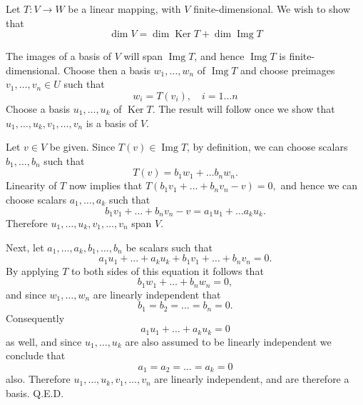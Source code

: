 \documentclass[12pt]{article}
\newcommand{\Ker}{\mathop{\mathrm{Ker}}}
\newcommand{\Img}{\mathop{\mathrm{Img}}}
\begin{document}
Let $T:V\rightarrow W$ be a linear mapping, with $V$
finite-dimensional.  We wish to show that
$$\dim V = \dim \Ker T + \dim\Img T$$

The images of a basis of $V$ will span $\Img T$, and hence $\Img T$ is
finite-dimensional.  Choose then a basis $w_1,\ldots,w_n$ of $\Img T$
and choose preimages $v_1,\ldots,v_n\in U$ such that 
$$w_i = T(v_i),\quad i=1\ldots n$$
Choose a basis $u_1,\ldots,u_k$ of $\Ker T$.  The result will follow
once we show that $u_1,\ldots,u_k,v_1,\ldots,v_n$ is a basis of $V$.

Let $v\in V$ be given.  Since $T(v)\in \Img T$, by definition, we can
choose scalars $b_1,\ldots,b_n$ such that
$$T(v)= b_1 w_1 + \ldots b_n w_n.$$
Linearity of $T$ now implies that
$T(b_1 v_1 + \ldots + b_n v_n-v) = 0,$
and hence we can choose scalars $a_1,\ldots, a_k$ such that
$$b_1 v_1 + \ldots + b_n v_n-v = a_1 u_1 + \ldots a_k u_k.$$
Therefore $u_1,\ldots,u_k,v_1,\ldots,v_n$ span $V$.

Next, let $a_1,\ldots, a_k,b_1,\ldots,b_n$ be scalars such that
$$a_1 u_1+\ldots +a_k u_k + b_1 v_1 + \ldots + b_n v_n = 0.$$
By applying $T$ to both sides of this equation it follows that
$$b_1 w_1 + \ldots + b_n w_n =0,$$
and since $w_1,\ldots, w_n$ are linearly independent that
$$b_1= b_2 = \ldots = b_n = 0.$$
Consequently 
$$a_1 u_1+\ldots +a_k u_k = 0$$
as well, and since $u_1,\ldots, u_k$ are also assumed to be linearly
independent we conclude that
$$a_1= a_2 = \ldots = a_k = 0$$
also.  Therefore $u_1,\ldots,u_k,v_1,\ldots,v_n$ are linearly
independent, and are therefore a basis. Q.E.D.
\end{document}

